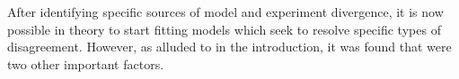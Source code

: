 After identifying specific sources of model and experiment divergence, it is now possible in theory to start fitting models which seek to resolve specific types of disagreement.
However, as alluded to in the introduction, it was found that were two other important factors. 




